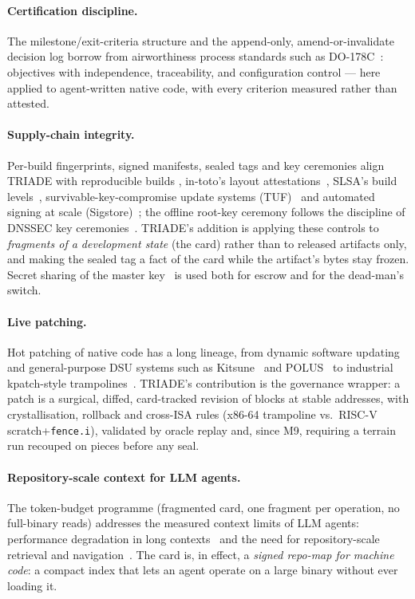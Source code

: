 \documentclass[10pt,a4paper]{article}
\newcommand{\code}[1]{\texttt{\small #1}}
\begin{document}
\paragraph{Certification discipline.} The milestone/exit-criteria
structure and the append-only, amend-or-invalidate decision log borrow
from airworthiness process standards such as
DO-178C~\cite{do178c}: objectives with independence, traceability, and
configuration control --- here applied to agent-written native code, with
every criterion measured rather than attested.

\paragraph{Supply-chain integrity.} Per-build fingerprints, signed
manifests, sealed tags and key ceremonies align TRIADE with
reproducible builds \cite{lamb2022}, in-toto's layout
attestations~\cite{intoto2019}, SLSA's build levels~\cite{slsa},
survivable-key-compromise update systems (TUF)~\cite{tuf2010} and
automated signing at scale (Sigstore)~\cite{sigstore2022}; the offline
root-key ceremony follows the discipline of DNSSEC key
ceremonies~\cite{rfc4033}. TRIADE's addition is applying these controls
to \emph{fragments of a development state} (the card) rather than to
released artifacts only, and making the sealed tag a fact of the card
while the artifact's bytes stay frozen. Secret sharing of the master
key~\cite{shamir1979} is used both for escrow and for the dead-man's
switch.

\paragraph{Live patching.} Hot patching of native code has a long
lineage, from dynamic software updating~\cite{hicks2002} and
general-purpose DSU systems such as Kitsune~\cite{hayden2012kitsune} and
POLUS~\cite{polusDSU} to industrial kpatch-style
trampolines~\cite{kpatch}. TRIADE's contribution is the
governance wrapper: a patch is a surgical, diffed, card-tracked revision
of blocks at stable addresses, with crystallisation, rollback and
cross-ISA rules (x86-64 trampoline vs.\ RISC-V scratch+\code{fence.i}),
validated by oracle replay and, since M9, requiring a terrain run
recouped on pieces before any seal.

\paragraph{Repository-scale context for LLM agents.} The token-budget
programme (fragmented card, one fragment per operation, no full-binary
reads) addresses the measured context limits of LLM agents: performance
degradation in long contexts~\cite{liu2024} and the need for
repository-scale retrieval and navigation~\cite{zhang2023, jimenez2024}.
The card is, in effect, a \emph{signed repo-map for machine code}: a
compact index that lets an agent operate on a large binary without ever
loading it.
\end{document}
